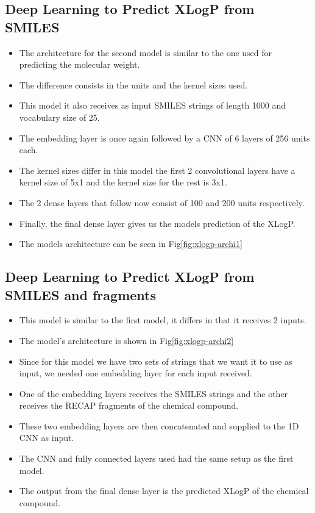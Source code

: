     \subsection{Deep Learning to Predict XLogP from SMILES}
        \begin{itemize}
            \item The architecture for the second model is similar to the one used for predicting the molecular weight.
            \item The difference consists in the units and the kernel sizes used.
            \item This model it also receives as input SMILES strings of length 1000 and vocabulary size of 25.
            \item The embedding layer is once again followed by a CNN of 6 layers of 256 units each.
            \item The kernel sizes differ in this model the first 2 convolutional layers have a kernel size of 5x1 and the kernel size for the rest is 3x1.
            \item The 2 dense layers that follow now consist of 100 and 200 units respectively. 
            \item Finally, the final dense layer gives us the models prediction of the XLogP.
            \item The models architecture can be seen in Fig\ref{fig:xlogp-archi1}
        \end{itemize}
    \subsection{Deep Learning to Predict XLogP from SMILES and fragments}
        \begin{itemize}
            \item This model is similar to the first model, it differs in that it receives 2 inputs. 
            \item The model's architecture is shown in Fig\ref{fig:xlogp-archi2}
            \item Since for this model we have two sets of strings that we want it to use as input, we needed one embedding layer for each input received.
            \item One of the embedding layers receives the SMILES strings and the other receives the RECAP fragments of the chemical compound.
            \item These two embedding layers are then concatenated and supplied to the 1D CNN as input.
            \item The CNN and fully connected layers used had the same setup as the first model.
            \item The output from the final dense layer is the predicted XLogP of the chemical compound.
        \end{itemize}
    
